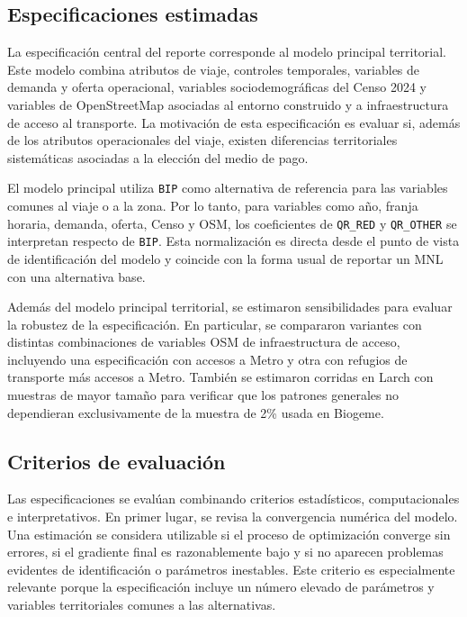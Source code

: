 \subsection{Especificaciones estimadas}

La especificación central del reporte corresponde al modelo principal territorial. Este modelo combina atributos de viaje, controles temporales, variables de demanda y oferta operacional, variables sociodemográficas del Censo 2024 y variables de OpenStreetMap asociadas al entorno construido y a infraestructura de acceso al transporte. La motivación de esta especificación es evaluar si, además de los atributos operacionales del viaje, existen diferencias territoriales sistemáticas asociadas a la elección del medio de pago.

El modelo principal utiliza \texttt{BIP} como alternativa de referencia para las variables comunes al viaje o a la zona. Por lo tanto, para variables como año, franja horaria, demanda, oferta, Censo y OSM, los coeficientes de \texttt{QR\_RED} y \texttt{QR\_OTHER} se interpretan respecto de \texttt{BIP}. Esta normalización es directa desde el punto de vista de identificación del modelo y coincide con la forma usual de reportar un MNL con una alternativa base.

Además del modelo principal territorial, se estimaron sensibilidades para evaluar la robustez de la especificación. En particular, se compararon variantes con distintas combinaciones de variables OSM de infraestructura de acceso, incluyendo una especificación con accesos a Metro y otra con refugios de transporte más accesos a Metro. También se estimaron corridas en Larch con muestras de mayor tamaño para verificar que los patrones generales no dependieran exclusivamente de la muestra de 2\% usada en Biogeme.

\subsection{Criterios de evaluación}

Las especificaciones se evalúan combinando criterios estadísticos, computacionales e interpretativos. En primer lugar, se revisa la convergencia numérica del modelo. Una estimación se considera utilizable si el proceso de optimización converge sin errores, si el gradiente final es razonablemente bajo y si no aparecen problemas evidentes de identificación o parámetros inestables. Este criterio es especialmente relevante porque la especificación incluye un número elevado de parámetros y variables territoriales comunes a las alternativas.

